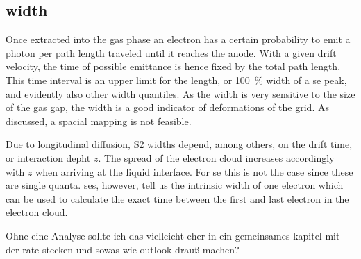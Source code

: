 
\FloatBarrier
\subsection{width}
\label{ssec:width}
\FloatBarrier


Once extracted into the gas phase an electron has a certain probability to emit a photon per path length traveled until it reaches the anode. %
With a given drift velocity, the time of possible emittance is hence fixed by the total path length.
This time interval is an upper limit for the length, or \SI{100}{\%} width of a \gls{se} peak, and evidently also other width quantiles.
As the width is very sensitive to the size of the gas gap, the width is a good indicator of deformations of the grid.
As discussed, a spacial mapping is not feasible.

Due to longitudinal diffusion, S2 widths depend, among others, on the drift time, or interaction depht $ z $.
The spread of the electron cloud increases accordingly with $ z $ when arriving at the liquid interface.
For \gls{se} this is not the case since these are single quanta.
\glspl{se}, however, tell us the intrinsic width of one electron which can be used to calculate the exact time between the first and last electron in the electron cloud.


Ohne eine Analyse sollte ich das vielleicht eher in ein gemeinsames kapitel mit der rate stecken und sowas wie outlook drauß machen?










